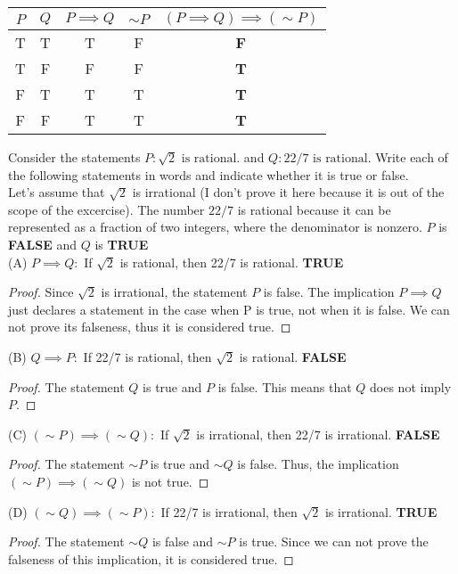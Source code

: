 \documentclass[12pt]{article}
\newenvironment{problem}[2][Problem]{\begin{trivlist}
		\item[\hskip \labelsep {\bfseries #1}\hskip \labelsep {\bfseries #2.}]}{\end{trivlist}}
\begin{document}
\begin{center}
\begin{tabular}{c c c c c}
	$P$ & $Q$ & $P \implies Q$ & $\sim P$ & $(P \implies Q) \implies (\sim P)$\\
	\hline
	T & T & T & F & \textbf{F} \\
	T & F & F & F & \textbf{T}\\
	F & T & T & T & \textbf{T}\\
	F & F & T & T & \textbf{T}\\
	\hline
\end{tabular}
\end{center}
\begin{problem}{21}
	Consider the statements $P:\sqrt{2} \text{ is rational.}$ and $Q:22/7 \text{ is rational.}$ Write each of the following statements in words and indicate whether it is true or false. \\
	
Let's assume that $\sqrt{2}$ is irrational (I don't prove it here because it is out of the scope of the excercise). The number $22/7$ is rational because it can be represented as a fraction of two integers, where the denominator is nonzero. $P$ is \textbf{FALSE} and $Q$ is \textbf{TRUE} \\

(A) $P \implies Q:$ If $\sqrt{2}$ is rational, then 22/7 is rational. \textbf{ TRUE}
\begin{proof}
	Since $\sqrt{2}$ is irrational, the statement $P$ is false. The implication $P \implies Q$ just declares a statement in the case when P is true, not when it is false. We can not prove its falseness, thus it is considered true.
\end{proof}
(B) $Q \implies P:$ If 22/7 is rational, then $\sqrt{2}$ is rational. \textbf{ FALSE}
\begin{proof}
	The statement $Q$ is true and $P$ is false. This means that $Q$ does not imply $P$. 
\end{proof}
(C) $(\sim P) \implies (\sim Q):$ If $\sqrt{2}$ is irrational, then 22/7 is irrational. \textbf{ FALSE}
\begin{proof}
	The statement $\sim P$ is true and $\sim Q$ is false. Thus, the implication $(\sim P) \implies (\sim Q)$ is not true. 
\end{proof}
(D) $(\sim Q) \implies (\sim P):$ If 22/7 is irrational, then $\sqrt{2}$ is irrational. \textbf{ TRUE}
\begin{proof}
	The statement $\sim Q$ is false and $\sim P$ is true. Since we can not prove the falseness of this implication, it is considered true.
\end{proof} 
\end{problem}
\end{document}
